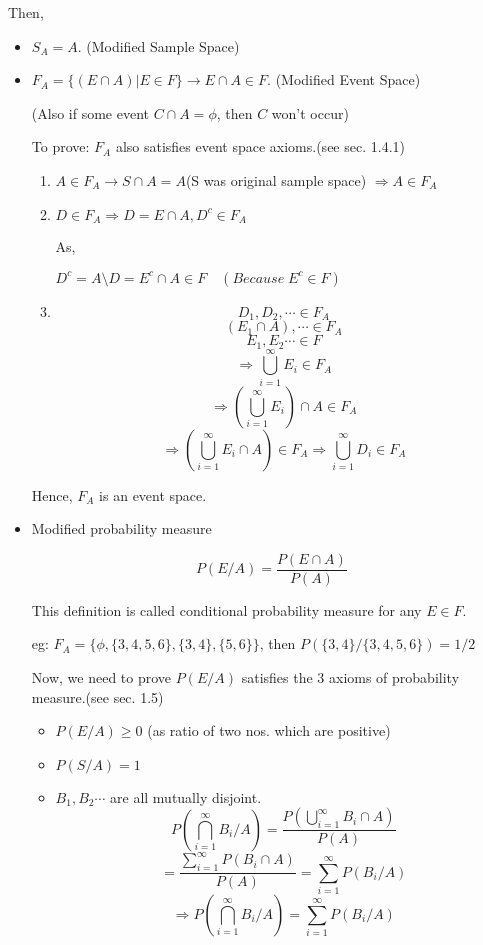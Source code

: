 \documentclass{article}
\begin{document}
Then,
\begin{itemize}
    \item $S_A = A$. (Modified Sample Space)

    \item $F_A = \{ (E \cap A) | E \in F \} \rightarrow E \cap A \in F$. (Modified Event Space)

    (Also if some event $C \cap A = \phi $, then $C$ won't occur)



    To prove: $F_A$ also satisfies event space axioms.(see sec. 1.4.1)

    \begin{enumerate}
        \item $A \in F_A \rightarrow S\cap A = A$(S was original sample space)
        $\Rightarrow A \in F_A$

        \item $D \in F_A \Rightarrow D = E \cap A, D^c \in F_A$

        As,

        $D^c = A \setminus D= E^c \cap A \in F \quad(Because\;  E^c \in F)$

        \item $$D_1,D_2,\cdots \in F_A$$
        $$ (E_1 \cap A), \cdots \in F_A$$
        $$ E_1, E_2 \cdots \in F$$
        $$  \Rightarrow \bigcup_{i=1}^{\infty} E_i \in F_A$$
        $$ \Rightarrow  (\bigcup_{i=1}^{\infty} E_i) \cap A \in F_A$$
        $$\Rightarrow  (\bigcup_{i=1}^{\infty} E_i \cap A) \in F_A \Rightarrow  \bigcup_{i=1}^{\infty} D_i \in F_A$$

    \end{enumerate}
    Hence, $F_A$ is an event space.

    \item Modified probability measure

    $$ P(E/A)= \frac{P(E \cap A)}{P(A)}$$

    This definition is called conditional probability measure for any $E \in F$.

    eg:
    $ F_A = \{ \phi, \{3,4,5,6\}, \{ 3,4\}, \{5,6\} \}$, then $P(\{ 3,4\} / \{3,4,5,6\})=1/2$

    Now, we need to prove $ P(E/A)$  satisfies the 3 axioms of probability measure.(see sec. 1.5)
    \begin{itemize}
        \item $ P(E/A) \geq 0$ (as ratio of two nos. which are positive)
        \item $ P(S/A)=1$
        \item $ B_1, B_2 \cdots$ are all mutually disjoint.
        $$ P(\bigcap_{i=1}^{\infty} B_i /A) = \frac{ P(\bigcup_{i=1}^{\infty} B_i \cap A)}{P(A)}$$
        $$ =\frac{\sum_{i=1}^{\infty} P(B_i \cap A)}{P(A)} = \sum_{i=1}^{\infty} P(B_i /A)$$
        $$  \Rightarrow P(\bigcap_{i=1}^{\infty} B_i /A) = \sum_{i=1}^{\infty} P(B_i /A)$$
    \end{itemize}
\end{itemize}
\end{document}
